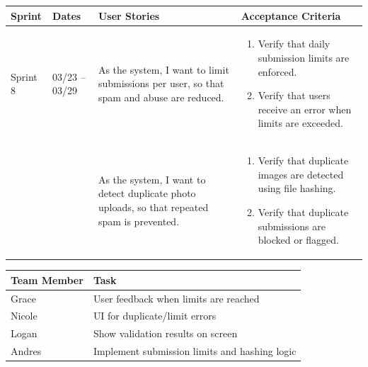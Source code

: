 \documentclass[12pt]{article}
\begin{document}
\noindent
\begin{tabular}{|L{1.2cm}|L{1.8cm}|L{5.2cm}|L{6.3cm}|}
\hline
\textbf{Sprint} & \textbf{Dates} & \textbf{User Stories} & \textbf{Acceptance Criteria} \\
\hline
Sprint 8 & 03/23 -- 03/29 &
As the system, I want to limit submissions per user, so that spam and abuse are reduced. &
\begin{enumerate}
    \item Verify that daily submission limits are enforced.
    \item Verify that users receive an error when limits are exceeded.
\end{enumerate} \\
& &
As the system, I want to detect duplicate photo uploads, so that repeated spam is prevented. &
\begin{enumerate}
    \item Verify that duplicate images are detected using file hashing.
    \item Verify that duplicate submissions are blocked or flagged.
\end{enumerate} \\
\hline
\end{tabular}

\vspace{0.5em}

\noindent
\begin{tabular}{|L{2.5cm}|L{12.5cm}|}
\hline
\textbf{Team Member} & \textbf{Task} \\
\hline
Grace & User feedback when limits are reached \\
\hline
Nicole & UI for duplicate/limit errors \\
\hline
Logan & Show validation results on screen \\
\hline
Andres & Implement submission limits and hashing logic \\
\hline
\end{tabular}

\vspace{2em}


\vspace{0.5em}
\end{document}
